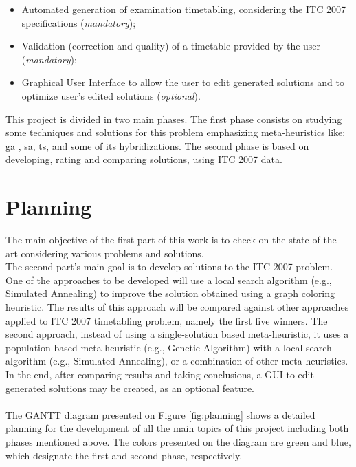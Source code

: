 \begin{itemize}
	\item Automated generation of examination timetabling, considering the ITC 2007 specifications (\textit{mandatory});
	\item Validation (correction and quality) of a timetable provided by the user (\textit{mandatory});
	\item Graphical User Interface to allow the user to edit generated solutions and to optimize user's edited solutions (\textit{optional}).
\end{itemize}

This project is divided in two main phases. The first phase consists on studying some techniques and solutions for this problem emphasizing meta-heuristics like: \gls{ga} , \gls{sa}, \gls{ts}, and some of its hybridizations. The second phase is based on developing, rating and comparing solutions, using ITC 2007 data.


\section{Planning}

The main objective of the first part of this work is to check on the state-of-the-art considering various problems and solutions.
\\
The second part's main goal is to develop solutions to the ITC 2007 problem.  One of the approaches to be developed will use a local search algorithm (e.g., Simulated Annealing) to improve the solution obtained using a graph coloring heuristic. The results of this approach will be compared against other approaches applied to ITC 2007 timetabling problem, namely the first five winners. The second approach, instead of using a single-solution based meta-heuristic, it uses a population-based meta-heuristic (e.g., Genetic Algorithm) with a local search algorithm (e.g., Simulated Annealing), or a combination of other meta-heuristics. In the end, after comparing results and taking conclusions, a GUI to edit generated solutions may be created, as an optional feature.\\
\\
The GANTT diagram presented on Figure \ref{fig:planning} shows a detailed planning for the development of all the main topics of this project including both phases mentioned above. The colors presented on the diagram are green and blue, which designate the first and second phase, respectively.\\

